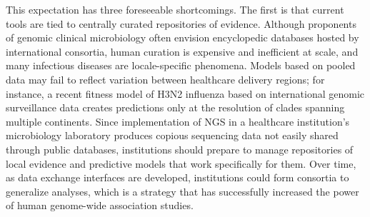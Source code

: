 This expectation has three foreseeable shortcomings. The first is that current tools are tied to centrally curated repositories of evidence. Although proponents of genomic clinical microbiology often envision encyclopedic databases hosted by international consortia,\autocite{Didelot2012,Koser2012} human curation is expensive and inefficient at scale, and many infectious diseases are locale-specific phenomena. Models based on pooled data may fail to reflect variation between healthcare delivery regions;\autocite{Reis2003,Wiens2014} for instance, a recent fitness model of H3N2 influenza based on international genomic surveillance data creates predictions only at the resolution of clades spanning multiple continents.\autocite{Luksza2014} Since implementation of NGS in a healthcare institution’s microbiology laboratory produces copious sequencing data not easily shared through public databases, institutions should prepare to manage repositories of local evidence and predictive models that work specifically for them. Over time, as data exchange interfaces are developed, institutions could form consortia to generalize analyses, which is a strategy that has successfully increased the power of human genome-wide association studies.

\newcommand*{\tabindent}{\hspace*{1em}}%

